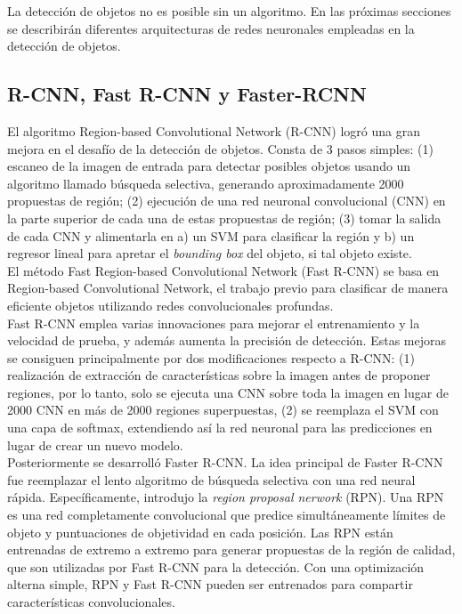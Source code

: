 \documentclass{bmvc2k}
\begin{document}
La detección de objetos no es posible sin un algoritmo. En las próximas secciones se describirán diferentes arquitecturas de redes neuronales empleadas en la detección de objetos.\\


\subsection{R-CNN, Fast R-CNN y Faster-RCNN}

El algoritmo Region-based Convolutional Network (R-CNN) logró una gran mejora en el desafío de la detección de objetos. Consta de 3 pasos simples: (1) escaneo de la imagen de entrada para detectar posibles objetos usando un algoritmo llamado búsqueda selectiva, generando aproximadamente 2000 propuestas de región; (2) ejecución de una red neuronal convolucional (CNN) en la parte superior de cada una de estas propuestas de región; (3) tomar la salida de cada CNN y alimentarla en a) un SVM para clasificar la región y b) un regresor lineal para apretar el \textit{bounding box} del objeto, si tal objeto existe.\\

El método Fast Region-based Convolutional Network (Fast R-CNN) se basa en Region-based Convolutional Network, el trabajo previo para clasificar de manera eficiente objetos utilizando redes convolucionales profundas.\\

Fast R-CNN emplea varias innovaciones para mejorar el entrenamiento y la velocidad de prueba, y además aumenta la precisión de detección. Estas mejoras se consiguen principalmente por dos modificaciones respecto a R-CNN: (1) realización de extracción de características sobre la imagen antes de proponer regiones, por lo tanto, solo se ejecuta una CNN sobre toda la imagen en lugar de 2000 CNN en más de 2000 regiones superpuestas, (2) se reemplaza el SVM con una capa de softmax, extendiendo así la red neuronal para las predicciones en lugar de crear un nuevo modelo.\\

Posteriormente se desarrolló Faster R-CNN. La idea principal de Faster R-CNN fue reemplazar el lento algoritmo de búsqueda selectiva con una red neural rápida. Específicamente, introdujo la \textit{region proposal nerwork} (RPN). Una RPN es una
red completamente convolucional que predice simultáneamente límites de objeto y puntuaciones de objetividad en cada posición. Las RPN están entrenadas de extremo a extremo para generar propuestas de la región de calidad, que son utilizadas por Fast R-CNN para la detección. Con una optimización alterna simple, RPN y Fast R-CNN pueden ser entrenados para compartir características convolucionales.\\
\end{document}
